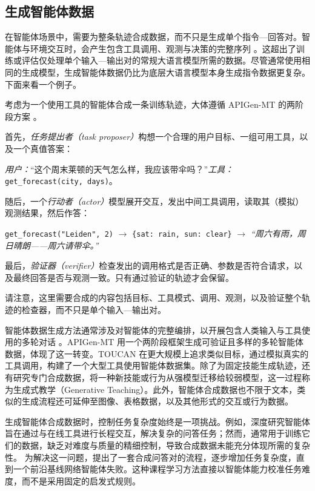 \subsection{生成智能体数据}
在智能体场景中，需要为整条轨迹合成数据，而不只是生成单个指令—回答对。智能体与环境交互时，会产生包含工具调用、观测与决策的完整序列 \citep{kang2025distilling}。这超出了训练或评估仅处理单个输入—输出对的常规大语言模型所需的数据。尽管通常使用相同的生成模型，生成智能体数据仍比为底层大语言模型本身生成指令数据更复杂。下面来看一个例子。


\begin{example}
考虑为一个使用工具的智能体合成一条训练轨迹，大体遵循 APIGen-MT 的两阶段方案 \citep{NEURIPS2025_5e3661f7}。

首先，{\em 任务提出者（task proposer）}构想一个合理的用户目标、一组可用工具，以及一个真值答案：

\emph{用户：}“这个周末莱顿的天气怎么样，我应该带伞吗？”\quad \emph{工具：}\texttt{get\_forecast(city, days)}。

随后，一个{\em 行动者（actor）}模型展开交互，发出中间工具调用，读取其（模拟）观测结果，然后作答：

\begin{center}\small
\texttt{get\_forecast("Leiden", 2)} $\rightarrow$ \texttt{\{sat: rain, sun: clear\}} $\rightarrow$ \emph{“周六有雨，周日晴朗——周六请带伞。”}
\end{center}

最后，{\em 验证器（verifier）}检查发出的调用格式是否正确、参数是否符合请求，以及最终回答是否与观测一致。只有通过验证的轨迹才会保留。

请注意，这里需要合成的内容包括目标、工具模式、调用、观测，以及验证整个轨迹的检查器，而不只是单个输入—输出对。
\end{example}

智能体数据生成方法通常涉及对智能体的完整编排，以开展包含人类输入与工具使用的多轮对话 \citep{wu2024autogen}。APIGen-MT \citep{NEURIPS2025_5e3661f7} 用一个两阶段框架生成可验证且多样的多轮智能体数据，体现了这一转变。TOUCAN \citep{xu2025toucansynthesizing15mtoolagentic} 在更大规模上追求类似目标，通过模拟真实的工具调用，构建了一个大型工具使用智能体数据集。除了为固定技能生成轨迹，还有研究专门合成数据，将一种新技能或行为从强模型迁移给较弱模型，这一过程称为生成式教学（Generative Teaching）\citep{crispino2023agent}。此外，智能体合成数据也不限于文本，类似的生成流程还可延伸至图像、表格数据，以及其他形式的交互或行为数据。

生成智能体合成数据时，控制任务复杂度始终是一项挑战。例如，深度研究智能体旨在通过与在线工具进行长程交互，解决复杂的问答任务；然而，通常用于训练它们的数据，缺乏对难度与质量的精细控制，导致合成数据未能充分体现所需的复杂性。\citet{pandit2025synthesizingagenticdataweb} 为解决这一问题，提出了一套合成问答对的流程，逐步增加任务复杂度，直到一个前沿基线网络智能体失败。这种课程学习方法直接以智能体能力校准任务难度，而不是采用固定的启发式规则。

